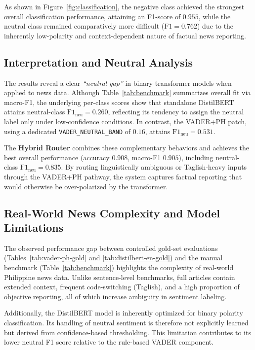 \documentclass[sigconf, nonacm]{acmart}
\begin{document}
As shown in Figure~\ref{fig:classification}, the negative class achieved the strongest overall classification performance, attaining an F1-score of $0.955$, while the neutral class remained comparatively more difficult ($\mathrm{F1}=0.762$) due to the inherently low-polarity and context-dependent nature of factual news reporting.

\subsection{Interpretation and Neutral Analysis}

The results reveal a clear \emph{``neutral gap''} in binary transformer models when applied to news data. Although Table~\ref{tab:benchmark} summarizes overall fit via macro-F1, the underlying per-class scores show that standalone DistilBERT attains neutral-class $\mathrm{F1}_{\mathrm{neu}}=0.260$, reflecting its tendency to assign the neutral label only under low-confidence conditions. In contrast, the VADER+PH patch, using a dedicated \texttt{VADER\_NEUTRAL\_BAND} of $0.16$, attains $\mathrm{F1}_{\mathrm{neu}}=0.531$.

The \textbf{Hybrid Router} combines these complementary behaviors and achieves the best overall performance (accuracy $0.908$, macro-F1 $0.905$), including neutral-class $\mathrm{F1}_{\mathrm{neu}}=0.835$. By routing linguistically ambiguous or Taglish-heavy inputs through the VADER+PH pathway, the system captures factual reporting that would otherwise be over-polarized by the transformer.

\subsection{Real-World News Complexity and Model Limitations}

The observed performance gap between controlled gold-set evaluations (Tables~\ref{tab:vader-ph-gold} and \ref{tab:distilbert-en-gold}) and the manual benchmark (Table~\ref{tab:benchmark}) highlights the complexity of real-world Philippine news data. Unlike sentence-level benchmarks, full articles contain extended context, frequent code-switching (Taglish), and a high proportion of objective reporting, all of which increase ambiguity in sentiment labeling.

Additionally, the DistilBERT model is inherently optimized for binary polarity classification. Its handling of neutral sentiment is therefore not explicitly learned but derived from confidence-based thresholding. This limitation contributes to its lower neutral F1 score relative to the rule-based VADER component.
\end{document}
